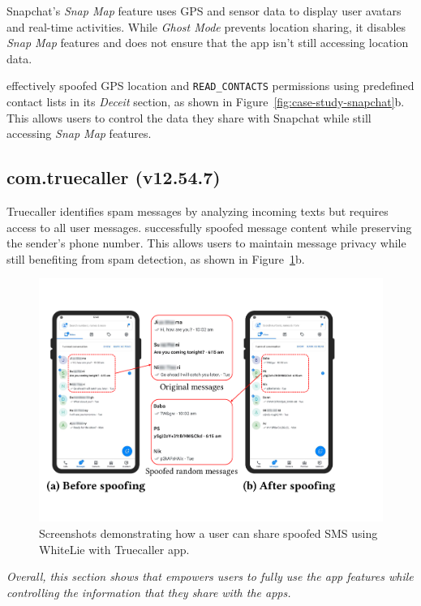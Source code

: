 Snapchat's \textit{Snap Map} feature uses GPS and sensor data to display user avatars and real-time activities. While \textit{Ghost Mode} prevents location sharing, it disables \textit{Snap Map} features and does not ensure that the app isn't still accessing location data.

\framework{} effectively spoofed GPS location and \texttt{READ\_CONTACTS} permissions using predefined contact lists in its \textit{Deceit} section, as shown in Figure~\ref{fig:case-study-snapchat}b. This allows users to control the data they share with Snapchat while still accessing \textit{Snap Map} features.

\subsection{com.truecaller (v12.54.7)}
\label{sec:tc_case_study}
Truecaller identifies spam messages by analyzing incoming texts but requires access to all user messages. \framework{} successfully spoofed message content while preserving the sender's phone number. This allows users to maintain message privacy while still benefiting from spam detection, as shown in Figure~\ref{fig:case-study-truecaller}b.

\begin{figure}
    \centering
    \includegraphics[width=0.75\linewidth]{Figures/Case Studies/truecaller_screenshots.pdf}
    \caption{Screenshots demonstrating how a user can share spoofed SMS using WhiteLie with Truecaller app.}
    \label{fig:case-study-truecaller}
\end{figure}

\textit{Overall, this section shows that \framework{} empowers users to fully use the app features while controlling the information that they share with the apps.}
